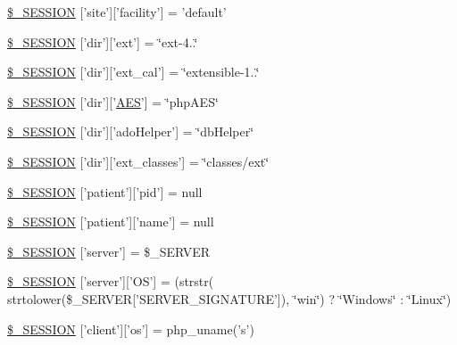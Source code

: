 \begin{DoxyCompactItemize}
$$\item 
\hyperlink{registry_8php_a74c68f0f19dcc92302c3f4cb06586556}{\$\-\_\-\-S\-E\-S\-S\-I\-O\-N} \mbox{[}'site'\mbox{]}\mbox{[}'facility'\mbox{]} = 'default'
\item 
\hyperlink{registry_8php_ac4a760f23d904ff9a7f6e5b2d1b53946}{\$\-\_\-\-S\-E\-S\-S\-I\-O\-N} \mbox{[}'dir'\mbox{]}\mbox{[}'ext'\mbox{]} = \char`\"{}ext-\/4..\char`\"{}
\item 
\hyperlink{registry_8php_a6532e3ef9690894f343bb3633b185d4f}{\$\-\_\-\-S\-E\-S\-S\-I\-O\-N} \mbox{[}'dir'\mbox{]}\mbox{[}'ext\-\_\-cal'\mbox{]} = \char`\"{}extensible-\/1..\char`\"{}
\item 
\hyperlink{registry_8php_a76ef65b7dd592e95ffa94107607e34f4}{\$\-\_\-\-S\-E\-S\-S\-I\-O\-N} \mbox{[}'dir'\mbox{]}\mbox{[}'\hyperlink{class_a_e_s}{\-A\-E\-S}'\mbox{]} = \char`\"{}php\-A\-E\-S\char`\"{}
\item 
\hyperlink{registry_8php_a4ef44640a35338f25c4ed6b2d6564b00}{\$\-\_\-\-S\-E\-S\-S\-I\-O\-N} \mbox{[}'dir'\mbox{]}\mbox{[}'ado\-Helper'\mbox{]} = \char`\"{}db\-Helper\char`\"{}
\item 
\hyperlink{registry_8php_a266e038ef50352013493970ed65dae0b}{\$\-\_\-\-S\-E\-S\-S\-I\-O\-N} \mbox{[}'dir'\mbox{]}\mbox{[}'ext\-\_\-classes'\mbox{]} = \char`\"{}classes/ext\char`\"{}
\item 
\hyperlink{registry_8php_a9fd347ae0bcd272e5a1ebefef4a9f4ca}{\$\-\_\-\-S\-E\-S\-S\-I\-O\-N} \mbox{[}'patient'\mbox{]}\mbox{[}'pid'\mbox{]} = null
\item 
\hyperlink{registry_8php_ac75ed6cc6c02a1138612fe71c56a98f3}{\$\-\_\-\-S\-E\-S\-S\-I\-O\-N} \mbox{[}'patient'\mbox{]}\mbox{[}'name'\mbox{]} = null
\item 
\hyperlink{registry_8php_a51d6a13cdd0e8d991294b44591665e26}{\$\-\_\-\-S\-E\-S\-S\-I\-O\-N} \mbox{[}'server'\mbox{]} = \$\-\_\-\-S\-E\-R\-V\-E\-R
\item 
\hyperlink{registry_8php_aceddd1f9a4bcd79348e3fa464e806c82}{\$\-\_\-\-S\-E\-S\-S\-I\-O\-N} \mbox{[}'server'\mbox{]}\mbox{[}'\-O\-S'\mbox{]} = (strstr( strtolower(\$\-\_\-\-S\-E\-R\-V\-E\-R\mbox{[}'\-S\-E\-R\-V\-E\-R\-\_\-\-S\-I\-G\-N\-A\-T\-U\-R\-E'\mbox{]}), \char`\"{}win\char`\"{}) ? \char`\"{}\-Windows\char`\"{} \-: \char`\"{}\-Linux\char`\"{})
\item 
\hyperlink{registry_8php_a970998bb254598c3f457e2ed2c2bc281}{\$\-\_\-\-S\-E\-S\-S\-I\-O\-N} \mbox{[}'client'\mbox{]}\mbox{[}'os'\mbox{]} = php\-\_\-uname('s')
\end{DoxyCompactItemize}


